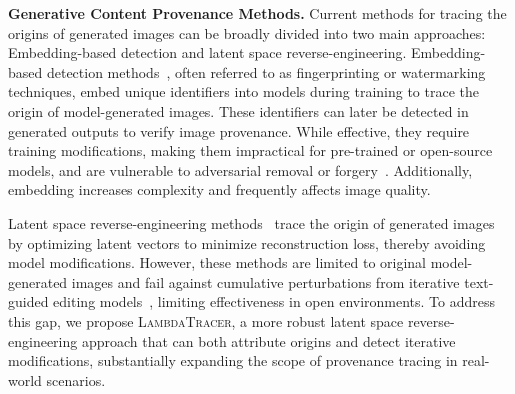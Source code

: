 \textbf{Generative Content Provenance Methods.} Current methods for tracing the origins of generated images can be broadly divided into two main approaches:
Embedding-based detection and latent space reverse-engineering. Embedding-based detection methods~\cite{tancik2020stegastamp,yu2021artificial,yu2020responsible,jeong2022fingerprintnet,sinitsa2024deep}, often referred to as fingerprinting or watermarking techniques, embed unique identifiers into models during training to trace the origin of model-generated images. These identifiers can later be detected in generated outputs to verify image provenance. While effective, they require training modifications, making them impractical for pre-trained or open-source models, and are vulnerable to adversarial removal or forgery~\cite{xu2020adversarial,sun2021detect}. Additionally, embedding increases complexity and frequently affects image quality.

Latent space reverse-engineering methods~\cite{creswell2018inverting,wang2023alteration,wang2024did,wang2024trace} trace the origin of generated images by %
optimizing latent vectors to minimize reconstruction loss, thereby avoiding model modifications. However, these methods are limited to original model-generated images and %
fail against cumulative perturbations from iterative text-guided editing models~\cite{brooks2023instructpix2pix,zhang2023adding,zhao2024uni,li2025controlnet}, limiting effectiveness in open environments. To address this gap, we propose \textsc{LambdaTracer}, a more robust latent space reverse-engineering approach that can both attribute origins and detect iterative modifications, substantially expanding the scope of provenance tracing in real-world scenarios.